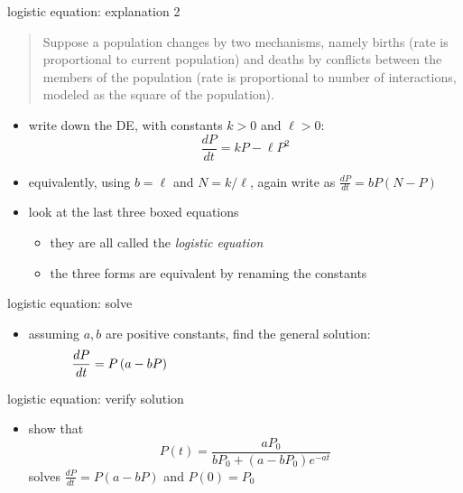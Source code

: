 \documentclass[colorlinks]{beamer}
\begin{document}
\begin{frame}{logistic equation: explanation 2}

\small
\begin{quotation}
\noindent Suppose a population changes by two mechanisms, namely births (rate is proportional to current population) and deaths by conflicts between the members of the population (rate is proportional to number of interactions, modeled as the square of the population).
\end{quotation}

\normalsize
\begin{itemize}
\item write down the DE, with constants $k>0$ and $\ell>0$:
    $$\boxed{\frac{dP}{dt} = k P - \ell P^2}$$
\item equivalently, using $b=\ell$ and $N=k/\ell$, again write as $\frac{dP}{dt} = b P \left(N-P\right)$
\item look at the last three boxed equations
    \begin{itemize}
    \item they are all called the \emph{logistic equation}
    \item the three forms are equivalent by renaming the constants
    \end{itemize}
\end{itemize}
\end{frame}


\begin{frame}{logistic equation: solve}

\begin{itemize}
\item assuming $a,b$ are positive constants, find the general solution:
    $$\frac{dP}{dt} = P \left(a - bP\right) \hspace{70mm}$$
\end{itemize}

\vspace{50mm}
\end{frame}


\begin{frame}{logistic equation: verify solution}

\begin{itemize}
\item show that
    $$P(t)=\frac{aP_0}{bP_0+(a-bP_0) e^{-at}}$$
solves $\frac{dP}{dt} = P \left(a-bP\right)$ and $P(0)=P_0$
\end{itemize}

\vspace{50mm}
\end{frame}
\end{document}
